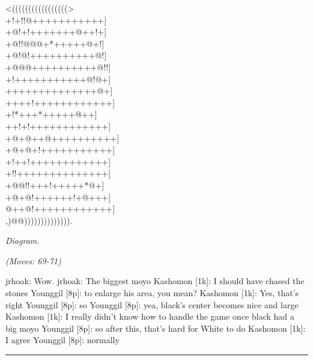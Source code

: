\documentclass[letterpaper,12pt]{memoir}
\newcounter{GoFigure}[part]
\newcommand{\gofigure}{%
 \stepcounter{GoFigure}
 \centerline{\textit{Diagram.\thinspace\arabic{GoFigure}}}
}
\newcommand{\subtext}[1]{\centerline{\textit{#1}}}
\begin{document}
\begin{minipage}[t]{240pt}
{\gnos
<(((((((((((((((((>\\
+!+!!@+++++++++++]\\
+@!+!+++++++@++!+]\\
+@!!@@@+*+++++@+!]\\
+@!@!++++++++++@!]\\
+@@@++++++++++@!!]\\
+!+++++++++++@!@+]\\
++++++++++++++@+]\\
++++!++++++++++++]\\
+!*+++*+++++@++]\\
++!+!++++++++++++]\\
+@+@++@++++++++++]\\
+@+@+!+++++++++++]\\
+!++!++++++++++++]\\
+!!++++++++++++++]\\
+@@!!+++!+++++*@+]\\
+@+@!++++++!+@+++]\\
@++@!++++++++++++]\\
,)@@)))))))))))))).\\
}
\gofigure

\subtext{(Moves: 69-71)}
\end{minipage}
\begin{minipage}[t]{268.19999999999993pt}
\setlength{\parskip}{0.5em}
jrhoak: Wow.
jrhoak: The biggest moyo
Kashomon [1k]: I should have chased the stones
Younggil [8p]: to enlarge his area, you mean?
Kashomon [1k]: Yes, that's right
Younggil [8p]: so
Younggil [8p]: yea, black's center becomes nice and large
Kashomon [1k]: I really didn't know how to handle the game once black had a big moyo
Younggil [8p]: so after this, that's hard for White to do
Kashomon [1k]: I agree
Younggil [8p]: normally


\end{minipage}
\vfill

\rule{\textwidth}{0.5pt}
\end{document}
